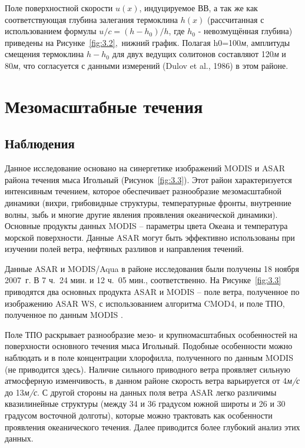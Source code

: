 {Поле поверхностной скорости $u(x)$, индуцируемое ВВ, а так же как соответствующая глубина залегания термоклина $h(x)$ (рассчитанная с использованием формулы $u/c=(h-h_{0} )/h$, где $h_{0} $ - невозмущённая глубина) приведены на Рисунке~\ref{fig:3.2},~нижний график. Полагая h0=100\textit{м}, амплитуды смещения термоклина $h-h_{0} $ для двух ведущих солитонов составляют 120\textit{м} и 80\textit{м}, что согласуется с данными измерений (Dulov et al., 1986) в этом районе.



\section{Мезомасштабные течения} \label{sec:3.2}



\subsection{Наблюдения} \label{sec:3.2.1}


Данное исследование основано на синергетике изображений MODIS и ASAR района течения мыса Игольный (Рисунок~\ref{fig:3.3}). Этот район характеризуется интенсивным течением, которое обеспечивает разнообразие мезомасштабной динамики (вихри, грибовидные структуры, температурные фронты, внутренние волны, зыбь и многие другие явления проявления океанической динамики). Основные продукты данных MODIS -- параметры цвета Океана и температура морской поверхности. Данные ASAR могут быть эффективно использованы при изучении полей ветра, нефтяных разливов и направления течений.

Данные ASAR и MODIS/Aqua в районе исследования были получены 18 ноября 2007~г. В 7 ч.~24 мин. и 12 ч.~05 мин., соответственно. На Рисунке~\ref{fig:3.3} приводятся два основных продукта ASAR и MODIS -- поле ветра, полученное по изображению ASAR WS, с использованием алгоритма CMOD4, и поле ТПО, полученное по данным MODIS \citep{Brown1999}.

Поле ТПО раскрывает разнообразие мезо- и крупномасштабных особенностей на поверхности основного течения мыса Игольный. Подобные особенности можно наблюдать и в поле концентрации хлорофилла, полученного по данным MODIS (не приводится здесь). Наличие сильного приводного ветра проявляет сильную атмосферную изменчивость, в данном районе скорость ветра варьируется от 4\textit{м/с} до 13\textit{м/с}. С другой стороны на данных поля ветра ASAR легко различимы квазилинейные структуры (между 34 и 36 градусом южной широты и 26 и 30 градусом восточной долготы), которые можно трактовать как особенности проявления океанического течения. Далее приводится более глубокий анализ этих данных.



}
